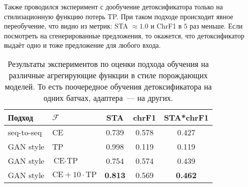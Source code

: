 Также проводился эксперимент с дообучение детоксификатора только на стилизационную функцию потерь TP. 
При таком подходе происходит явное переобучение, что видно из метрик: STA $\approx 1.0$ и ChrF1 в $5$ раз меньше. 
Если посмотреть на сгенерированные предложения, то окажется, что детоксификатор выдаёт одно и тоже предложение для любого входа.

\begin{table}[ht]
\centering
 \begin{tabular}{|l l|c c c|} 
 \hline
 Подход & $\mathcal{F} $ & STA & chrF1 & STA*chrF1 \\ [0.5ex] 
 \hline
 seq-to-seq & CE & 0.739 & 0.578 & 0.427 \\ 
 GAN style & TP & 0.998 & 0.119 & 0.119 \\ 
 GAN style & $\text{CE} \cdot \text{TP}$  & 0.754 & 0.574 & 0.439 \\
 GAN style & $\text{CE} + 10 \cdot \text{TP}$ & \textbf{0.813} & 0.569 & \textbf{0.462} \\
 \hline
 \end{tabular}
\caption{
    Результаты экспериментов по оценки подхода обучения на различные агрегирующие функции в стиле порождающих моделей. 
    То есть поочередное обучения детоксификатора на одних батчах, адаптера~--- на других. 
}
\label{table:final_exp}
\end{table}
